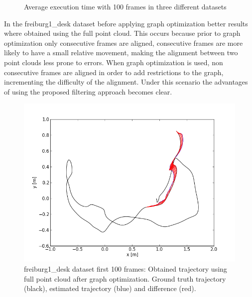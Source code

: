 \begin{center}
\begin{figure}
\caption{Average execution time with 100 frames in three different datasets} 
\end{figure}
\end{center}

In the freiburg1\_desk dataset before applying graph optimization better results where obtained using 
the full point cloud. This occurs because prior to graph optimization only consecutive frames are aligned, 
consecutive frames are more likely to have a small relative movement, making the alignment between two point clouds 
less prone to 
errors. When graph optimization is used, non consecutive frames are aligned in order to add restrictions to the graph, 
incrementing the difficulty of 
the alignment. Under this scenario the advantages of using the proposed filtering approach becomes clear.


\begin{figure}[H]
\begin{center}
\includegraphics[scale=0.75]{images/freiburg1_desk_1_100_fullcloud_optimized.png}
\caption{freiburg1\_desk dataset first 100 frames: Obtained trajectory using full point cloud after graph optimization. Ground truth trajectory (black), estimated trajectory (blue) and difference (red).}
\end{center}
\end{figure}

